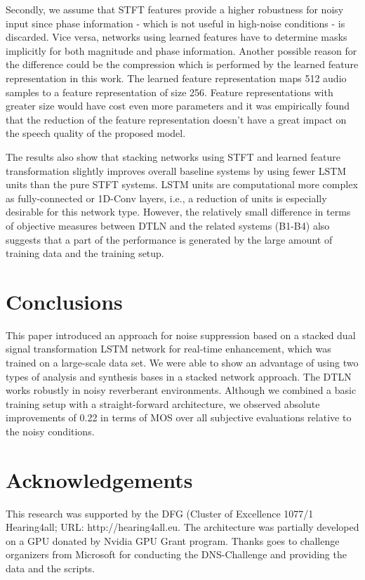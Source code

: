 \documentclass[a4paper]{article}
\begin{document}
Secondly, we assume that STFT features provide a higher robustness for noisy input since phase information - which is not useful in high-noise conditions - is discarded. 
Vice versa, networks using learned features have to determine masks implicitly for both magnitude and phase information. 
Another possible reason for the difference could be the compression which is performed by the learned feature representation in this work. The learned feature representation maps 512 audio samples to a feature representation of size 256. Feature representations with greater size would have cost even more parameters and it was empirically found that the reduction of the feature representation doesn't have a great impact on the speech quality of the proposed model. 

The results also show that stacking networks using STFT and learned feature transformation slightly improves overall baseline systems by using fewer LSTM units than the pure STFT systems. 
LSTM units are computational more complex as fully-connected or 1D-Conv layers, i.e., a reduction of units is especially desirable for this network type.
However, the relatively small difference in terms of objective measures between DTLN and the related systems (B1-B4) also suggests that a part of the performance is generated by the large amount of training data and the training setup.

\section{Conclusions}
This paper introduced an approach for noise suppression based on a stacked dual signal transformation LSTM network for real-time enhancement, which was trained on a large-scale data set. We were able to show an advantage of using two types of analysis and synthesis bases in a stacked network approach. The DTLN works robustly in noisy reverberant environments.
Although we combined a basic training setup with a straight-forward architecture, we observed absolute improvements of 0.22 in terms of MOS over all subjective evaluations relative to the noisy conditions. 

\section{Acknowledgements}
This research was supported by the DFG (Cluster of Excellence 1077/1 Hearing4all; URL: http://hearing4all.eu. The architecture was partially developed on a GPU donated by Nvidia GPU Grant program. Thanks goes to challenge organizers from Microsoft for conducting the DNS-Challenge and providing the data and the scripts.





\end{document}
